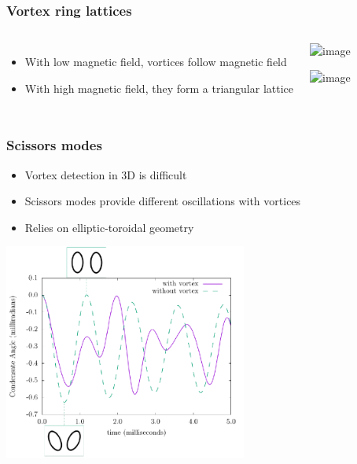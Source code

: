 \documentclass{beamer}
\begin{document}
\begin{frame}
\frametitle{Vortex ring lattices}

\begin{columns}
\begin{itemize}
\item With low magnetic field, vortices follow magnetic field
\item With high magnetic field, they form a triangular lattice
\end{itemize}
\begin{center}
\includegraphics<1>[width=\linewidth]{vortex_line_all_1.png}

\includegraphics<2->[width=\linewidth]{vortex_line_all_2.png}
\end{center}
\end{columns}
\end{frame}

\begin{frame}
\frametitle{Scissors modes}
\begin{itemize}
\item Vortex detection in 3D is difficult
\item Scissors modes provide different oscillations with vortices
\item Relies on elliptic-toroidal geometry
\end{itemize}
\begin{center}
\includegraphics[width=0.6\textwidth]{../data/3d/scissors_plot.pdf}
\end{center}
\end{frame}
\end{document}

